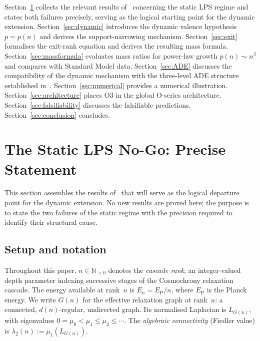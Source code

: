 \documentclass[11pt,a4paper]{article}
\newcommand{\ltwo}{\lambda_{2}}
\newcommand{\EP}{E_{\mathrm{P}}}
\begin{document}
      Section~\ref{sec:nogo} collects the relevant results of~\cite{Beau2026a5}
      concerning the static LPS regime and states both failures precisely, serving as
      the logical starting point for the dynamic extension.
      Section~\ref{sec:dynamic} introduces the dynamic valence hypothesis
      $p = p(n)$ and derives the support-narrowing mechanism.
      Section~\ref{sec:exit} formalises the exit-rank equation and derives the
      resulting mass formula.
      Section~\ref{sec:massformula} evaluates mass ratios for power-law
      growth $p(n)\sim n^{\beta}$ and compares with Standard Model data.
      Section~\ref{sec:ADE} discusses the compatibility of the dynamic mechanism
      with the three-level ADE structure established in~\cite{Beau2026a4}.
      Section~\ref{sec:numerical} provides a numerical illustration.
      Section~\ref{sec:architecture} places O3 in the global O-series architecture.
      Section~\ref{sec:falsifiability} discusses the falsifiable predictions.
      Section~\ref{sec:conclusion} concludes.

  \section{The Static LPS No-Go: Precise Statement}
    \label{sec:nogo}


    This section assembles the results of~\cite{Beau2026a5} that will serve as
    the logical departure point for the dynamic extension.
    No new results are proved here; the purpose is to state the two failures of the
    static regime with the precision required to identify their structural cause.

    \subsection{Setup and notation}
      \label{subsec:setup}

      Throughout this paper, $n\in\mathbb{N}_{>0}$ denotes the \emph{cascade rank},
      an integer-valued depth parameter indexing successive stages of the
      Cosmochrony relaxation cascade.
      The energy available at rank~$n$ is $E_{n} = \EP/n$, where $\EP$ is the Planck energy.
      We write $G(n)$ for the effective relaxation graph at rank~$n$: a connected,
      $d(n)$-regular, undirected graph.
      Its normalised Laplacian is $L_{G(n)}$, with eigenvalues
      $0 = \mu_{0} < \mu_{1} \leq \mu_{2} \leq \cdots$.
      The \emph{algebraic connectivity} (Fiedler value) is $\ltwo(n) := \mu_{1}(L_{G(n)})$.
\end{document}
